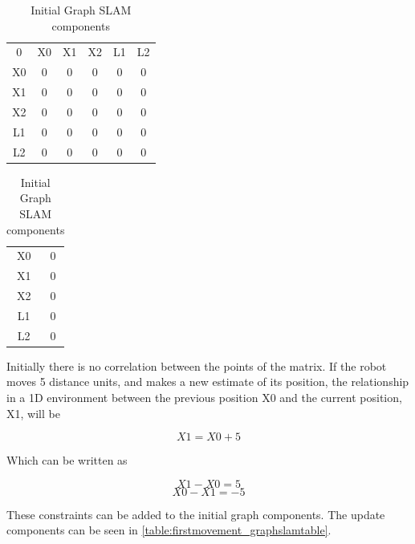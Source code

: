 \documentclass[Main]{subfiles}
\begin{document}
\begin{table}[H]
	\begin{subtable}{0.5\linewidth}
		\centering
	\begin{tabular}{cccccc}
		0 & X0 & X1 & X2 & L1 & L2 \\ 
		X0 & 0 & 0 & 0 & 0 & 0  \\ 
		X1 & 0 & 0 & 0 & 0 & 0  \\ 
		X2 & 0 & 0 & 0 & 0 & 0  \\  
		L1 & 0 & 0 & 0 & 0 & 0  \\ 
		L2 & 0 & 0 & 0 & 0 & 0  \\ 
	\end{tabular}
	\caption{$\Omega$ }
	\label{table:omegaone} 
	\end{subtable}
	\begin{subtable}{0.5\linewidth}
		\centering
		\begin{tabular}{cc}
			X0 & 0 \\ 
			X1 & 0 \\ 
			X2 & 0 \\ 
			L1 & 0 \\  
			L2 & 0 \\ 
		\end{tabular}
	\caption{$\xi$}
	\label{table:xione} 
	\end{subtable}
\caption{Initial Graph SLAM components}
\label{table:initialgraphslamtable} 
\end{table}
\vspace{-12pt}
Initially there is no correlation between the points of the matrix.
If the robot moves 5 distance units, and makes a new estimate of its position, the relationship in a 1D environment between the previous position X0 and the current position, X1, will be

	\begin{equation}
		X1 = X0 + 5
	\end{equation}
	
Which can be written as

	\begin{equation}
		X1 - X0 = 5
	\end{equation}
	\begin{equation}
		X0 - X1 = -5
	\end{equation}
	
These constraints can be added to the initial graph components. The update components can be seen in \autoref{table:firstmovement_graphslamtable}. 
\end{document}
